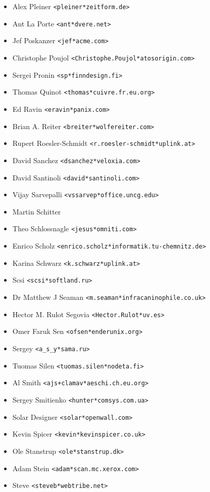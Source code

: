 \documentclass[a4paper,titlepage,12pt]{article}
\newcommand{\email}[1]{\texttt{#1}}
\begin{document}
\begin{itemize}
	\item Alex Pleiner \email{<pleiner*zeitform.de>}
	\item Ant La Porte \email{<ant*dvere.net>}
	\item Jef Poskanzer \email{<jef*acme.com>}
	\item Christophe Poujol \email{<Christophe.Poujol*atosorigin.com>}
	\item Sergei Pronin \email{<sp*finndesign.fi>}
	\item Thomas Quinot \email{<thomas*cuivre.fr.eu.org>}
	\item Ed Ravin \email{<eravin*panix.com>}
	\item Brian A. Reiter \email{<breiter*wolfereiter.com>}
	\item Rupert Roesler-Schmidt \email{<r.roesler-schmidt*uplink.at>}
	\item David Sanchez \email{<dsanchez*veloxia.com>}
	\item David Santinoli \email{<david*santinoli.com>}
	\item Vijay Sarvepalli \email{<vssarvep*office.uncg.edu>}
	\item Martin Schitter
	\item Theo Schlossnagle \email{<jesus*omniti.com>}
	\item Enrico Scholz \email{<enrico.scholz*informatik.tu-chemnitz.de>}
	\item Karina Schwarz \email{<k.schwarz*uplink.at>}
	\item Scsi \email{<scsi*softland.ru>}
	\item Dr Matthew J Seaman \email{<m.seaman*infracaninophile.co.uk>}
	\item Hector M. Rulot Segovia \email{<Hector.Rulot*uv.es>}
	\item Omer Faruk Sen \email{<ofsen*enderunix.org>}
	\item Sergey \email{<a\_s\_y*sama.ru>}
	\item Tuomas Silen \email{<tuomas.silen*nodeta.fi>}
	\item Al Smith \email{<ajs+clamav*aeschi.ch.eu.org>}
	\item Sergey Smitienko \email{<hunter*comsys.com.ua>}
	\item Solar Designer \email{<solar*openwall.com>}
	\item Kevin Spicer \email{<kevin*kevinspicer.co.uk>}
	\item Ole Stanstrup \email{<ole*stanstrup.dk>}
	\item Adam Stein \email{<adam*scan.mc.xerox.com>}
	\item Steve \email{<steveb*webtribe.net>}

\end{itemize}
\end{document}
